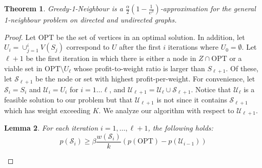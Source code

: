 \documentclass[12pt]{article}
\newtheorem{theorem}{Theorem}
\newtheorem{lemma}[theorem]{Lemma}
\newcommand{\OPT}{\ensuremath{\mathrm{OPT}\xspace}}
\begin{document}
\begin{theorem} \label{thm:gd1n}
{\sc Greedy-1-Neighbour} is a
$\frac{\alpha}{2}(1-\frac{1}{e^\beta})$-approximation for the
general 1-neighbour problem on directed and undirected graphs.
\end{theorem}

\begin{proof}
Let $\OPT$ be the set of vertices in an optimal solution.  In addition, let $U_i =\cup_{j = 1}^{i} V(S_j)$ correspond to $U$ after the first $i$ iterations where $U_{0} = \emptyset$.  Let $\ell+1$ be the first iteration in which there is either a node in $Z \cap \OPT$ or a viable set in $\OPT \setminus U_\ell$ whose profit-to-weight ratio is larger than $S_{\ell+1}$.  Of these, let $\mathcal{S}_{\ell+1}$ be the node or set with highest profit-per-weight.  For convenience, let  $\mathcal{S}_{i} = S_{i}$ and $\mathcal{U}_{i} = U_{i}$ for $i = 1 \ldots \ell$, and $\mathcal{U}_{\ell+1} = \mathcal{U}_{\ell} \cup \mathcal{S}_{\ell+1}$.  Notice that $\mathcal{U}_{\ell}$ is a feasible solution to our problem but that $\mathcal{U}_{\ell+1}$ is not since it contains $\mathcal{S}_{\ell+1}$ which has weight exceeding $K$.  We analyze our algorithm with respect to $\mathcal{U}_{\ell+1}$.

\begin{lemma} \label{lem:profit-inc-dag}
For each iteration $i = 1, \ldots, \ell+1$, the following holds:
$$p(\mathcal{S}_i) \geq \beta\frac{w(\mathcal{S}_i)}{k}\left(p(\OPT)-p(\mathcal{U}_{i-1})\right)$$
\end{lemma}










\end{proof}
\end{document}
